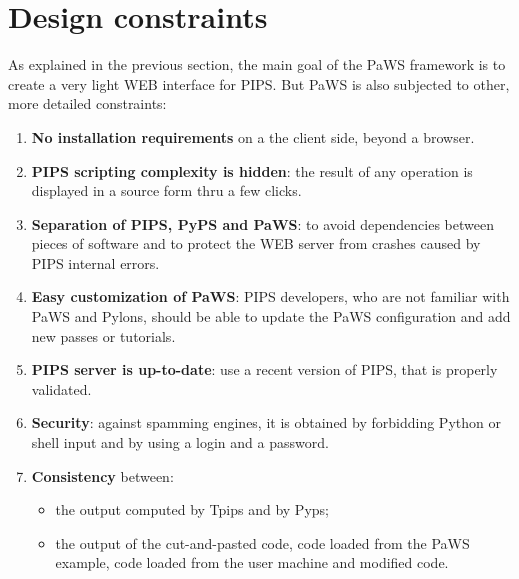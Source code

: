 \section{Design constraints}
\label{design_contraints}

As explained in the previous section, the main goal of the PaWS
framework is to create a very light WEB interface for PIPS. But PaWS is also
subjected to other, more detailed constraints:

\begin{enumerate}

  \item {\bf No installation requirements} on a the client side, beyond
  a browser.

  \item {\bf PIPS scripting complexity is hidden}: the result of any
    operation is displayed in a source form thru a few clicks.

  \item {\bf Separation of PIPS, PyPS and PaWS}: to avoid dependencies
    between pieces of software and to protect the WEB server from crashes
    caused by PIPS internal errors.

  \item {\bf Easy customization of PaWS}: PIPS developers, who are not
    familiar with PaWS and Pylons, should be able to update the PaWS
    configuration and add new passes or tutorials. 


  \item {\bf PIPS server is up-to-date}: use a recent version of PIPS,
    that is properly validated.

  \item {\bf Security}: against spamming engines, it is obtained by
    forbidding Python or shell input and by using a login and a
    password.

  \item {\bf Consistency} between:
    \begin{itemize}
      \item the output computed by Tpips and by Pyps;
      \item the output of the cut-and-pasted code, code loaded from
        the PaWS example, code loaded from the user machine and
        modified code.
    \end{itemize}


\end{enumerate}
